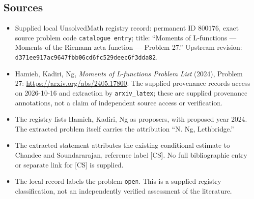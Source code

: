 \documentclass[11pt]{article}
\begin{document}
\subsection{Sources}
\begin{itemize}
\item Supplied local UnsolvedMath registry record: permanent ID \(800176\), exact source problem code \texttt{catalogue entry}; title: ``Moments of L-functions --- Moments of the Riemann zeta function --- Problem 27.'' Upstream revision: \texttt{d371ee917ac9647fbb06cd6fc529deec6f3dda82}.
\item Hamieh, Kadiri, Ng, \emph{Moments of L-functions Problem List} (2024), Problem 27: \url{https://arxiv.org/abs/2405.17800}. The supplied provenance records access on 2026-10-16 and extraction by \texttt{arxiv\_latex}; these are supplied provenance annotations, not a claim of independent source access or verification.
\item The registry lists Hamieh, Kadiri, Ng as proposers, with proposed year 2024. The extracted problem itself carries the attribution ``N. Ng, Lethbridge.''
\item The extracted statement attributes the existing conditional estimate to Chandee and Soundararajan, reference label [CS]. No full bibliographic entry or separate link for [CS] is supplied.
\item The local record labels the problem \texttt{open}. This is a supplied registry classification, not an independently verified assessment of the literature.
\end{itemize}
\end{document}
